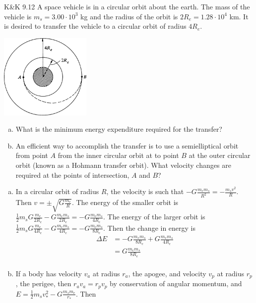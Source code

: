 \documentclass{esg8012pset}
\begin{document}
\begin{solution}
\begin{problem}{K\&K 9.12}
  A space vehicle is in a circular orbit about the earth. The mass of the vehicle is $m_s = 3.00 \cdot 10^3$ kg and the radius of the orbit is $2R_e = 1.28 \cdot 10^4$ km. It is desired to transfer the vehicle to a circular orbit of radius $4R_e$.
  \begin{center}\includegraphics[width=0.33\textwidth]{ps10_2}\end{center}
  \begin{enumerate}[(a)]
    \item What is the minimum energy expenditure required for the transfer?
    \item An efficient way to accomplish the transfer is to use a semielliptical orbit from point $A$ from the inner circular orbit at to point $B$ at the outer circular orbit (known as a Hohmann transfer orbit). What velocity changes are required at the points of intersection, $A$ and $B$?
  \end{enumerate}
\end{problem}
\begin{solution}
\begin{enumerate}[(a)]
  \item In a circular orbit of radius $R$, the velocity is such that $-G\frac{m_e m_s}{R^2} = -\frac{m_s v^2}{R}$.  Then $v = \pm \sqrt{G\frac{m_e}{R}}$.  The energy of the smaller orbit is $\frac{1}{2} m_s G\frac{m_e}{2R_e} - G\frac{m_e m_s}{2R_e} = -G\frac{m_e m_s}{4R_e}$.  The energy of the larger orbit is $\frac{1}{2} m_s G\frac{m_e}{4R_e} - G\frac{m_e m_s}{4R_e} = -G\frac{m_e m_s}{8R_e}$.  Then the change in energy is \begin{align*}
 \Delta E & = -G\frac{m_e m_s}{8R_e} + G\frac{m_e m_s}{4R_e} \\
 & = G\frac{m_e m_s}{8R_e} \\
\end{align*}
  \item If a body has velocity $v_a$ at radius $r_a$, the apogee, and velocity $v_p$ at radius $r_p$, the perigee, then $r_a v_a = r_p v_p$ by conservation of angular momentum, and $E = \frac{1}{2} m_s v_*^2 - G\frac{m_s m_e}{r_*}$.  Then \begin{align*}

\end{align*}
\end{enumerate}
\end{solution}
\end{solution}
\end{document}

